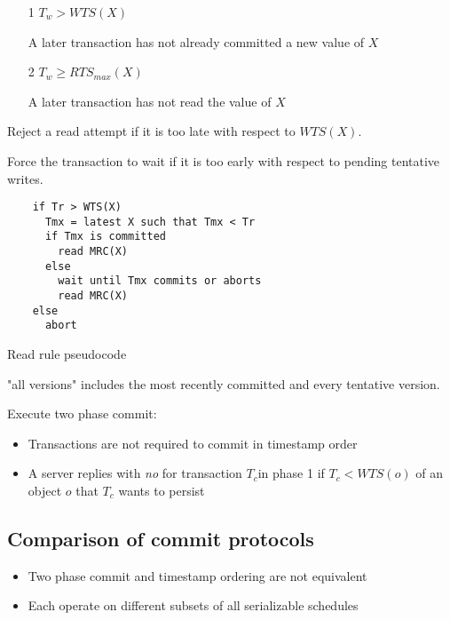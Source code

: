 \documentclass[a4paper]{article}
\begin{document}
\begin{enumerate}
  \item[1]
    $T_{w} > WTS(X)$

    A later transaction has not already committed a new value of $X$

  \item[2]
    $T_{w} \geq RTS_{max}(X)$

    A later transaction has not read the value of $X$
\end{enumerate}


Reject a read attempt if it is too late with respect to $WTS(X)$.

Force the transaction to wait if it is too early with respect to pending
tentative writes.

\begin{listing}[h]
  \begin{verbatim}
    if Tr > WTS(X)
      Tmx = latest X such that Tmx < Tr
      if Tmx is committed
        read MRC(X)
      else
        wait until Tmx commits or aborts
        read MRC(X)
    else
      abort
  \end{verbatim}
  \caption{Read rule pseudocode}
  \label{listing:read_rule_pseudocode}
\end{listing}

"all versions" includes the most recently committed and every tentative version.


Execute two phase commit:

\begin{itemize}
  \item Transactions are not required to commit in timestamp order
  \item A server replies with \textit{no} for transaction $T_{c} $in phase 1 if
        $T_{c} < WTS(o)$ of an object $o$ that $T_{c}$ wants to persist
\end{itemize}

\subsection{Comparison of commit protocols}

\begin{itemize}
  \item Two phase commit and timestamp ordering are not equivalent
  \item Each operate on different subsets of all serializable schedules
\end{itemize}
\end{document}
